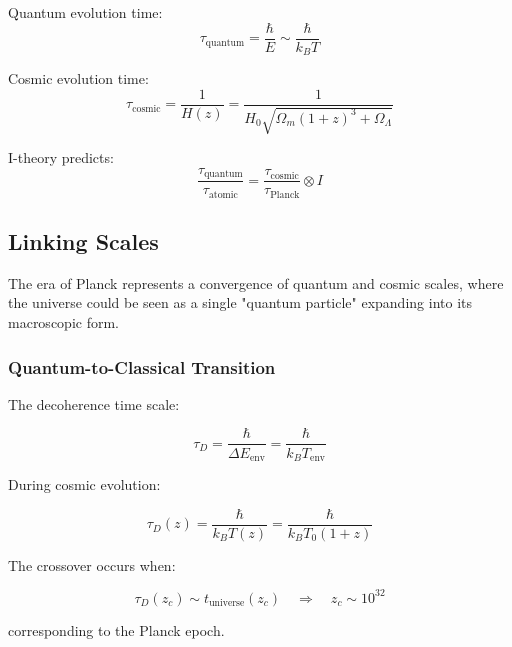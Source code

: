 Quantum evolution time:
\begin{equation}
\label{eq:quantum_time}
\tau_{\text{quantum}} = \frac{\hbar}{E} \sim \frac{\hbar}{k_B T}
\end{equation}

Cosmic evolution time:
\begin{equation}
\label{eq:cosmic_time}
\tau_{\text{cosmic}} = \frac{1}{H(z)} = \frac{1}{H_0\sqrt{\Omega_m(1+z)^3 + \Omega_\Lambda}}
\end{equation}

I-theory predicts:
\begin{equation}
\label{eq:time_correspondence}
\frac{\tau_{\text{quantum}}}{\tau_{\text{atomic}}} = \frac{\tau_{\text{cosmic}}}{\tau_{\text{Planck}}} \otimes I
\end{equation}

\subsection{Linking Scales}
\label{subsec:linking_scales}

The era of Planck represents a convergence of quantum and cosmic scales, where the universe could be seen as a single "quantum particle" expanding into its macroscopic form.

\subsubsection{Quantum-to-Classical Transition}

The decoherence time scale:

\begin{equation}
\label{eq:decoherence_time}
\tau_D = \frac{\hbar}{\Delta E_{\text{env}}} = \frac{\hbar}{k_B T_{\text{env}}}
\end{equation}

During cosmic evolution:

\begin{equation}
\label{eq:cosmic_decoherence_time}
\tau_D(z) = \frac{\hbar}{k_B T(z)} = \frac{\hbar}{k_B T_0(1+z)}
\end{equation}

The crossover occurs when:

\begin{equation}
\label{eq:quantum_classical_boundary}
\tau_D(z_c) \sim t_{\text{universe}}(z_c) \quad \Rightarrow \quad z_c \sim 10^{32}
\end{equation}

corresponding to the Planck epoch.

